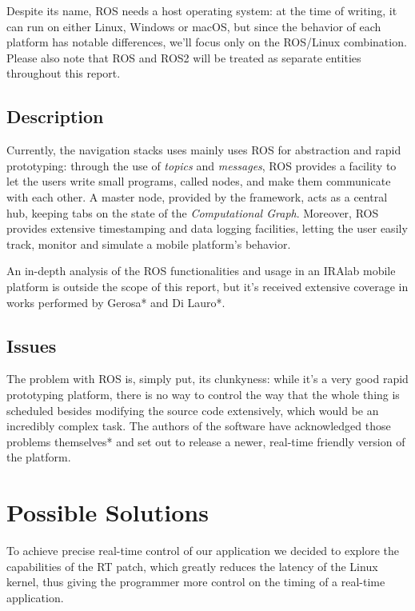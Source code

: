 \documentclass[a4paper,12pt]{report}
\begin{document}
Despite its name, ROS needs a host operating system: at the time of writing, it can run on either Linux, Windows or macOS, but since the behavior of each platform has notable differences, we'll focus only on the ROS/Linux combination. Please also note that ROS and ROS2 will be treated as separate entities throughout this report.

\subsection{Description}

Currently, the navigation stacks uses mainly uses ROS for abstraction and rapid prototyping: through the use of \textit{topics} and \textit{messages}, ROS provides a facility to let the users write small programs, called nodes, and make them communicate with each other. A master node, provided by the framework, acts as a central hub, keeping tabs on the state of the \textit{Computational Graph}. Moreover, ROS provides extensive timestamping and data logging facilities, letting the user easily track, monitor and simulate a mobile platform's behavior.

An in-depth analysis of the ROS functionalities and usage in an IRAlab mobile platform is outside the scope of this report, but it's received extensive coverage in works performed by Gerosa* and Di Lauro*.

\subsection{Issues}

The problem with ROS is, simply put, its clunkyness: while it's a very good rapid prototyping platform, there is no way to control the way that the whole thing is scheduled besides modifying the source code extensively, which would be an incredibly complex task. The authors of the software have acknowledged those problems themselves* and set out to release a newer, real-time friendly version of the platform.


\section{Possible Solutions}

To achieve precise real-time control of our application we decided to explore the capabilities of the RT patch, which greatly reduces the latency of the Linux kernel, thus giving the programmer more control on the timing of a real-time application. 
\end{document}
